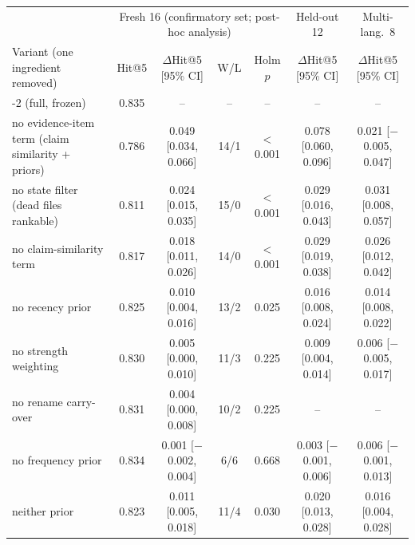 \begin{tabular}{lcccccc}
\toprule
 & \multicolumn{4}{c}{Fresh 16 (confirmatory set; post-hoc analysis)} & Held-out 12 & Multi-lang.\ 8 \\
Variant (one ingredient removed) & Hit@5 & $\Delta$Hit@5 [95\% CI] & W/L & Holm $p$ & $\Delta$Hit@5 [95\% CI] & $\Delta$Hit@5 [95\% CI] \\
\midrule
\sys{}-2 (full, frozen) & 0.835 & -- & -- & -- & -- & -- \\
\midrule
no evidence-item term (claim similarity + priors) & 0.786 & 0.049 [0.034, 0.066] & 14/1 & $<$0.001 & 0.078 [0.060, 0.096] & 0.021 [$-$0.005, 0.047] \\
no state filter (dead files rankable) & 0.811 & 0.024 [0.015, 0.035] & 15/0 & $<$0.001 & 0.029 [0.016, 0.043] & 0.031 [0.008, 0.057] \\
no claim-similarity term & 0.817 & 0.018 [0.011, 0.026] & 14/0 & $<$0.001 & 0.029 [0.019, 0.038] & 0.026 [0.012, 0.042] \\
no recency prior & 0.825 & 0.010 [0.004, 0.016] & 13/2 & 0.025 & 0.016 [0.008, 0.024] & 0.014 [0.008, 0.022] \\
no strength weighting & 0.830 & 0.005 [0.000, 0.010] & 11/3 & 0.225 & 0.009 [0.004, 0.014] & 0.006 [$-$0.005, 0.017] \\
no rename carry-over & 0.831 & 0.004 [0.000, 0.008] & 10/2 & 0.225 & -- & -- \\
no frequency prior & 0.834 & 0.001 [$-$0.002, 0.004] & 6/6 & 0.668 & 0.003 [$-$0.001, 0.006] & 0.006 [$-$0.001, 0.013] \\
neither prior & 0.823 & 0.011 [0.005, 0.018] & 11/4 & 0.030 & 0.020 [0.013, 0.028] & 0.016 [0.004, 0.028] \\
\bottomrule
\end{tabular}